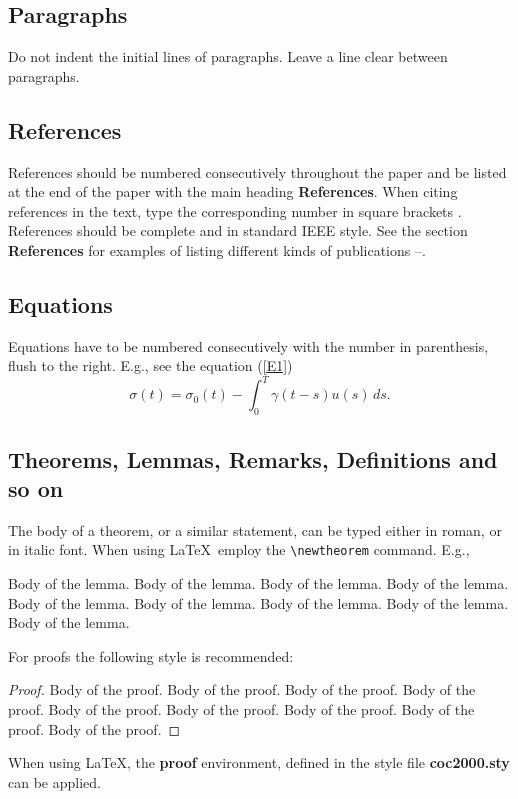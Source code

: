 \subsection{Paragraphs}
Do not indent the initial lines of paragraphs.
Leave a line clear between paragraphs.

\subsection{References} References should be numbered
consecutively throughout the paper and be listed at the end
of the paper with the main heading {\bf References}.
When citing references in the text, type the
corresponding number in square brackets \cite{1}.
References should be complete and in standard IEEE style.
See the section {\bf References} for examples of listing
different kinds of publications \cite{1}--\cite{3}.

\subsection{Equations}
Equations have to be numbered consecutively with the number
in parenthesis, flush to the right. E.g., see
the equation (\ref{E1})
\begin{equation}                        \label{E1}
\sigma(t)=\sigma_0(t)-\int_0^T \gamma(t-s)u(s)\,ds.
\end{equation}

\subsection{Theorems, Lemmas, Remarks, Definitions and so on}
The body of a theorem, or a similar statement, can be typed
either in roman, or in italic font. When using \LaTeX~employ the
\verb|\newtheorem| command. E.g.,
\begin{lemma}
Body of the lemma. Body of the lemma. Body of the lemma.
Body of the lemma. Body of the lemma. Body of the lemma.
Body of the lemma. Body of the lemma. Body of the lemma.
\end{lemma}

For proofs the following style is recommended:

\begin{proof}
Body of the proof. Body of the proof. Body of the proof.
Body of the proof. Body of the proof. Body of the proof.
Body of the proof. Body of the proof. Body of the proof.
\end{proof}
When using LaTeX, the {\bf proof} environment, defined
in the style file {\bf coc2000.sty} can be applied.

